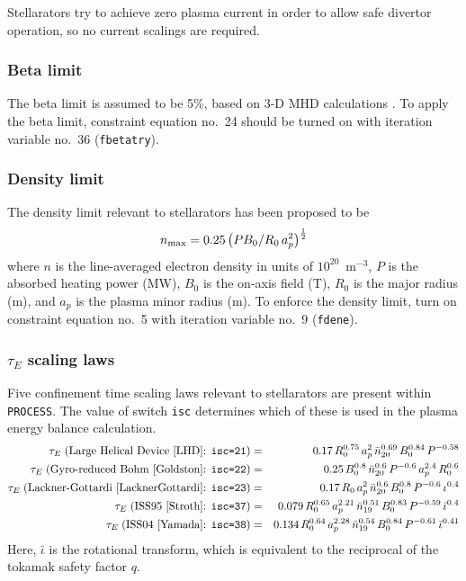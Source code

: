 \documentclass[11pt,a4paper]{report}
\newcommand{\process}{\mbox{\texttt{PROCESS}}}
\begin{document}
Stellarators try to achieve zero plasma current in order to allow safe
divertor operation, so no current scalings are required.

\subsubsection{Beta limit}

The beta limit is assumed to be 5\%, based on 3-D MHD calculations
\cite{Nuhrenberg}. To apply the beta limit, constraint equation no.\ 24 should
be turned on with iteration variable no.\ 36 (\texttt{fbetatry}).

\subsubsection{Density limit}

The density limit relevant to stellarators has been proposed to be~\cite{LHD}
\begin{equation}
n_{\mbox{\scriptsize max}} = 0.25\left( P B_0 / R_0 \, a_p^2\right)^\frac{1}{2}
\end{equation}
where $n$ is the line-averaged electron density in units of
$10^{20}$~m$^{-3}$, $P$ is the absorbed heating power (MW), $B_0$ is the
on-axis field (T), $R_0$ is the major radius (m), and $a_p$ is the plasma
minor radius (m). To enforce the density limit, turn on constraint equation
no.\ 5 with iteration variable no.\ 9 (\texttt{fdene}).

\subsubsection{$\tau_E$ scaling laws}


Five confinement time scaling laws relevant to stellarators are present
within \process. The value of switch \texttt{isc} determines which of these is
used in the plasma energy balance calculation.
\begin{eqnarray}
\tau_E\; (\mbox{Large Helical Device~\cite{LHD}: \texttt{isc=21}})
& = & 0.17 \, R_0^{0.75} \, a_p^2 \, \bar{n}_{20}^{0.69} \, B_0^{0.84} \, P^{-0.58} \\
\tau_E\; (\mbox{Gyro-reduced Bohm~\cite{Goldston}: \texttt{isc=22}})
 & = & 0.25 \, B_0^{0.8} \, \bar{n}_{20}^{0.6} \, P^{-0.6} \, a_p^{2.4} \, R_0^{0.6} \\
\tau_E\; (\mbox{Lackner-Gottardi~\cite{LacknerGottardi}: \texttt{isc=23}})
& = & 0.17 \, R_0 \, a_p^2 \, \bar{n}_{20}^{0.6} \, B_0^{0.8} \, P^{-0.6} \, \iota^{0.4} \\
\tau_E\; (\mbox{ISS95~\cite{Stroth}: \texttt{isc=37}})
& = & 0.079 \, R_0^{0.65} \, a_p^{2.21} \, \bar{n}_{19}^{0.51} \, B_0^{0.83}
\, P^{-0.59} \, \bar{\iota}^{0.4} \\
\tau_E\; (\mbox{ISS04~\cite{Yamada}: \texttt{isc=38}})
& = & 0.134 \, R_0^{0.64} \, a_p^{2.28} \, \bar{n}_{19}^{0.54} \, B_0^{0.84}
\, P^{-0.61} \, \bar{\iota}^{0.41}
\end{eqnarray}
Here, $\bar{\iota}$ is the rotational transform, which is equivalent to the reciprocal
of the tokamak safety factor $q$.
\end{document}
